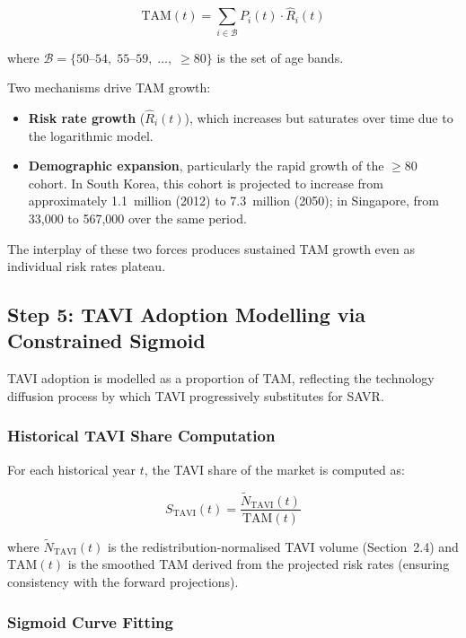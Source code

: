 \documentclass[12pt, a4paper]{article}
\begin{document}
\begin{equation}
    \mathrm{TAM}(t) = \sum_{i \in \mathcal{B}} P_i(t) \cdot \hat{R}_i(t)
\end{equation}

\noindent where $\mathcal{B} = \{50\text{--}54, \; 55\text{--}59, \; \ldots, \; \geq 80\}$ is the set of age bands.

Two mechanisms drive TAM growth:

\begin{itemize}[leftmargin=*, itemsep=4pt]
    \item \textbf{Risk rate growth} ($\hat{R}_i(t)$), which increases but saturates over time due to the logarithmic model.
    \item \textbf{Demographic expansion}, particularly the rapid growth of the $\geq$80 cohort. In South Korea, this cohort is projected to increase from approximately 1.1~million (2012) to 7.3~million (2050); in Singapore, from 33,000 to 567,000 over the same period.
\end{itemize}

The interplay of these two forces produces sustained TAM growth even as individual risk rates plateau.

\subsection{Step 5: TAVI Adoption Modelling via Constrained Sigmoid}

TAVI adoption is modelled as a proportion of TAM, reflecting the technology diffusion process by which TAVI progressively substitutes for SAVR.

\subsubsection{Historical TAVI Share Computation}

For each historical year $t$, the TAVI share of the market is computed as:

\begin{equation}
    S_{\mathrm{TAVI}}(t) = \frac{\tilde{N}_{\mathrm{TAVI}}(t)}{\mathrm{TAM}(t)}
\end{equation}

\noindent where $\tilde{N}_{\mathrm{TAVI}}(t)$ is the redistribution-normalised TAVI volume (Section~2.4) and $\mathrm{TAM}(t)$ is the smoothed TAM derived from the projected risk rates (ensuring consistency with the forward projections).

\subsubsection{Sigmoid Curve Fitting}
\end{document}
